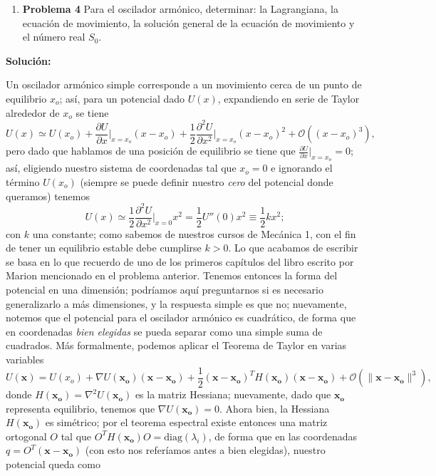\documentclass{article}
\begin{document}
\begin{enumerate}[label={{\textcolor{trueblue}{\textbf{Pr.} \arabic*.4}}}, start=2]
  \item \textbf{Problema 4} Para el oscilador armónico, determinar: la Lagrangiana, la ecuación de movimiento, la solución general de la ecuación de movimiento y el número real $S_{0}$.
\end{enumerate}

\textcolor{Cinnabar}{\textbf{Soluci\'on:}}

Un oscilador arm\'onico simple corresponde a un movimiento cerca de un punto de equilibrio $x_o$; as\'i, para un potencial dado $U(x)$, expandiendo en serie de Taylor alrededor de $x_o$ se tiene
\begin{equation}
    U(x) \simeq U(x_o) + \frac{\partial U}{\partial x}\Bigr|_{x=x_o} (x-x_o) + \frac{1}{2}\frac{\partial^2 U}{\partial x^2}\Bigr|_{x=x_o}(x-x_o)^2 + \mathcal{O}((x-x_o)^3),
\end{equation}
pero dado que hablamos de una posici\'on de equilibrio se tiene que $\frac{\partial U}{\partial x} |_{x=x_o}=0$; as\'i, eligiendo nuestro sistema de coordenadas tal que $x_o=0$ e ignorando el t\'ermino $U(x_o)$ (siempre se puede definir nuestro \textit{cero} del potencial donde queramos) tenemos
\begin{equation}
    U(x) \simeq \frac{1}{2}\frac{\partial^2 U}{\partial x^2}\Bigr|_{x=0}x^2=\frac{1}{2}U''(0)x^2\equiv \frac{1}{2}kx^2;
\end{equation}
con $k$ una constante; como sabemos de nuestros cursos de Mec\'anica 1, con el fin de tener un equilibrio estable debe cumplirse $k>0$. Lo que acabamos de escribir se basa en lo que recuerdo de uno de los primeros cap\'itulos del libro escrito por Marion mencionado en el problema anterior. Tenemos entonces la forma del potencial en una dimensi\'on; podr\'iamos aqu\'i preguntarnos si es necesario generalizarlo a m\'as dimensiones, y la respuesta simple es que no; nuevamente, notemos que el potencial para el oscilador arm\'onico es cuadr\'atico, de forma que en coordenadas \textit{bien elegidas} se pueda separar como una simple suma de cuadrados. M\'as formalmente, podemos aplicar el Teorema de Taylor en varias variables
\begin{equation}
    U(\mathbf{x})=U(x_o) + \nabla U(\mathbf{x_o}) (\mathbf{x}-\mathbf{x_o}) + \frac{1}{2} (\mathbf{x}-\mathbf{x_o})^T H(\mathbf{x_o}) (\mathbf{x}-\mathbf{x_o}) + \mathcal{O}(\|\mathbf{x}-\mathbf{x_o}\|^3),
\end{equation}
donde $H(\mathbf{x_o})=\nabla^2U(\mathbf{x_o})$ es la matriz Hessiana; nuevamente, dado que $\mathbf{x_o}$ representa equilibrio, tenemos que $\nabla U(\mathbf{x_o})=0$. Ahora bien, la Hessiana $H(\mathbf{x_o})$ es sim\'etrico; por el teorema espectral existe entonces una matriz ortogonal $O$ tal que $O^T H(\mathbf{x_o}) O = \text{diag}(\lambda_i)$, de forma que en las coordenadas $q=O^T(\mathbf{x}-\mathbf{x_o})$ (con esto nos refer\'iamos antes a bien elegidas), nuestro potencial queda como
\end{document}
